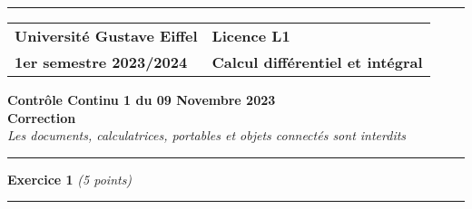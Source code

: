\documentclass[a4paper,12pt]{article}
\begin{document}
\noindent

\begin{center}
\hrule
\vspace{.1cm}
\begin{tabular}{>{\raggedright}p{} >{\raggedleft\arraybackslash}p{}}
\textbf{Université Gustave Eiffel} & \textbf{Licence L1} \\
\textbf{1er semestre 2023/2024} & \textbf{Calcul différentiel et intégral} \\
\end{tabular}

\vspace{.5cm}
\textbf{Contrôle Continu 1 du 09 Novembre 2023} 
\\
\textbf{Correction} \\
\textit{Les documents, calculatrices, portables et objets connectés sont interdits}
\vspace{.5cm}
\textcolor{gray}{\hrule}
\end{center}


\newcommand{\exercice}[2]{\vspace{1cm}
\noindent \large \textbf{Exercice #1} \textit{(#2 points)}
\vspace{0.1cm}
\hrule
\vspace{.5cm}
}


\exercice{1}{5}
\end{document}
